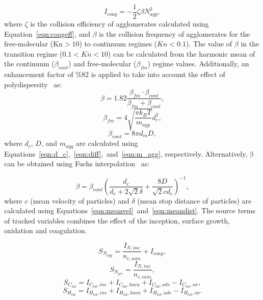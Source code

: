 \begin{equation}
	I_{coag} = -\frac{1}{2}\zeta\beta N^2_{agg}
	\label{eqn:Icoag},
\end{equation}
where $\zeta$ is the collision efficiency of agglomerates calculated using Equation~\eqref{eqn:coageff}, and ${\beta}$ is the collision frequency of agglomerates for the free-molecular ($\mathrm{Kn>10}$) to continuum regimes (${Kn<0.1}$). The value of ${\beta}$ in the transition regime (${0.1<Kn<10}$) can be calculated from the harmonic mean of the continuum (${\beta_{cont}}$) and free-molecular (${\beta_{fm}}$) regime values. Additionally, an enhancement factor of \%82 is applied to take into account the effect of polydispersity~\citep{kelesidis2021self} as:
\begin{equation}
	\beta = 1.82\frac{\beta_{fm}\cdot\beta_{cont}}{\beta_{fm}+\beta_{cont}}
	\label{eqn:betahmmono},
\end{equation}
\begin{equation}
	\beta_{fm} = 4\sqrt{\frac{\pi k_B T}{m_{agg}}} d^2_c
	\label{eqn:betafmmono},
\end{equation}
\begin{equation}
	\beta_{cont} = 8\pi d_m D,
	\label{eqn:betacontmono}
\end{equation}
\noindent where $d_c$, $D$, and $m_{agg}$ are calculated using Equations~\eqref{eqn:d_c},~\eqref{eqn:diff},~and~\eqref{eqn:m_agg}, respectively.
Alternatively, $\mathrm{\beta}$ can be obtained using Fuchs interpolation~\citep{fuchs1965mechanics} as:

\begin{equation}
	\beta = \beta_{cont}
	\left(
	\frac{d_c}{d_c+2\sqrt{2}\delta} +
	\frac{8D}{\sqrt{2}c d_c}
	\right)^{-1},
	\label{eqn:betafuchsmono}
\end{equation}
\noindent where $c$ (mean velocity of particles) and $\delta$ (mean stop distance of particles) are calculated using Equations~\eqref{eqn:meanvel}~and~\eqref{eqn:meandist}. The source terms of tracked variables combines the effect of the inception, surface growth, oxidation and coagulation.

\begin{equation}
	S_{N_{agg}} = \frac{I_{N,inc}}{n_{c,min}}+I_{coag},
	\label{eqn:S_N_agg}
\end{equation}
\begin{equation}
	S_{N_{pri}} = \frac{I_{N,inc}}{n_{c,min}},
	\label{eqn:S_N_pri}
\end{equation}
\begin{equation}
	S_{C_{tot}} = I_{C_{tot},inc}+I_{C_{tot},haca}+I_{C_{tot},ads} - I_{C_{tot},ox},
	\label{eqn:S_C_tot}
\end{equation}
\begin{equation}
	S_{H_{tot}} = I_{H_{tot},inc}+I_{H_{tot},haca}+I_{H_{tot},ads} - I_{H_{tot},ox}.
	\label{eqn:S_H_tot}
\end{equation}



